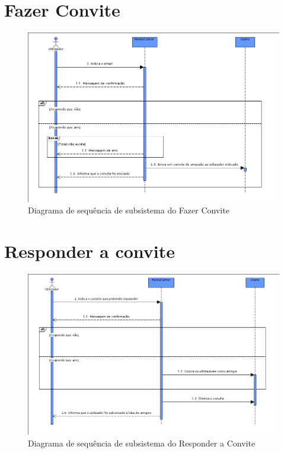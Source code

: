 \documentclass[a4paper]{report}
\begin{document}
\section{Fazer Convite}
\begin{figure}[H]
	\centering 
    \includegraphics[width=\textwidth]{images/fazerconviteSub.png}  
    \caption{Diagrama de sequência de subsistema do Fazer Convite}
\end{figure}

\section{Responder a convite}
\begin{figure}[H]
	\centering 
    \includegraphics[width=\textwidth]{images/respconviteSub.png}  
    \caption{Diagrama de sequência de subsistema do Responder a Convite}
\end{figure}
\end{document}
